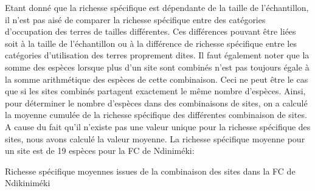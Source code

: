 \documentclass[
  12pt,
  a4paper,
  extrafontsizes,
  onecolumn,
  openright]{book}
\theoremstyle{definition}
\theoremstyle{definition}
\theoremstyle{definition}
\theoremstyle{definition}
\theoremstyle{remark}
\begin{document}
\begin{table}
\centering
\caption{\label{tab:ComparaisonrichesseNanga-Eboko3}Richesse spécifique observée des differentes catégories d'utilisation des terres dans la FC de Nanga-Eboko.}
\centering
{}
\end{table}

Etant donné que la richesse spécifique est dépendante de la taille de l'échantillon, il n'est pas aisé de comparer la richesse spécifique entre des catégories d'occupation des terres de tailles différentes. Ces différences pouvant être liées soit à la taille de l'échantillon ou à la différence de richesse spécifique entre les catégories d'utilisation des terres proprement dites. Il faut également noter que la somme des espèces lorsque plus d'un site sont combinés n'est pas toujours égale à la somme arithmétique des espèces de cette combinaison. Ceci ne peut être le cas que si les sites combinés partagent exactement le même nombre d'espèces. Ainsi, pour déterminer le nombre d'espèces dans des combinaisons de sites, on a calculé la moyenne cumulée de la richesse spécifique des différentes combinaison de sites. A cause du fait qu'il n'existe pas une valeur unique pour la richesse spécifique des sites, nous avons calculé la valeur moyenne. La richesse spécifique moyenne pour un site est de 19 espèces pour la FC de Ndiniméki:

Richesse spécifique moyennes issues de la combinaison des sites dans la FC de Ndikiniméki
\end{document}
